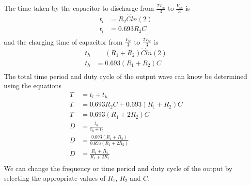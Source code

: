 The time taken by the capacitor to discharge from $\frac{2V_{cc}}{3}$ to $\frac{V_{cc}}{3}$ is 
\begin{align*}
    t_l &= R_2 \dot C \dot ln(2) \\
    t_l &= 0.693R_2C \\
\end{align*}
and the charging time of capacitor from $\frac{V_{cc}}{3}$ to $\frac{2V_{cc}}{3}$ is 
\begin{align*}
    t_h &= (R_1 + R_2) \dot C \dot ln(2) \\
    t_h &= 0.693(R_1 + R_2)C \\
\end{align*}
The total time period and duty cycle of the output wave can know be determined using the equations 
\begin{align*}
    T &= t_l + t_h \\
    T &= 0.693R_2C + 0.693(R_1 + R_2)C \\
    T &= 0.693(R_1 + 2R_2)C \\
    D &= \frac{t_h}{t_h + t_l} \\
    D &= \frac{0.693(R_1 + R_2)}{0.693(R_1 + 2R_2)} \\
    D &= \frac{R_1 + R_2}{R_1 + 2R_2} \\
\end{align*}
We can change the frequency or time period and duty cycle of the output by selecting the appropriate values of $R_1$, $R_2$ and 
$C$.

